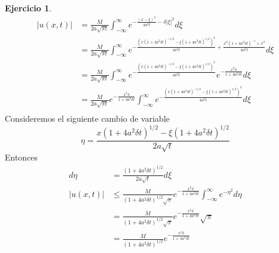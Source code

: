 \documentclass{article}
\theoremstyle{plain}
\theoremstyle{definition}
\newtheorem{ex}[proposición]{Ejercicio}
\begin{document}
\begin{ex}
\begin{align*}
    |u(x,t)| &= \frac{M}{2a\sqrt{\pi t}} \int_{-\infty}^{\infty} e^{-\frac{(x - \xi)^2}{4a^2 t} -\delta|\xi|^{2}} d\xi\\
    &= \frac{M}{2a\sqrt{\pi t}} \int_{-\infty}^{\infty} e^{-\frac{(x(1 + 4a^2 \delta  t)^{-1/2} - \xi(1+4a^2\delta  t)^{1/2})^{2}}{4a^2t} + \frac{x^2(1+4a^2\delta  t)^{-1} + x^{2}}{4a^{2}t}} d\xi \\
    &= \frac{M}{2a\sqrt{\pi t}} \int_{-\infty}^{\infty} e^{-\frac{(x(1 + 4a^2 \delta  t)^{-1/2} - \xi(1+4a^2\delta  t)^{1/2})^{2}}{4a^2t}} e^{-\frac{x^2\delta}{1+4a^2\delta  t}} d\xi \\
    &= \frac{M}{2a\sqrt{\pi t}} e^{-\frac{x^2\delta}{1+4a^2\delta  t}} \int_{-\infty}^{\infty} e^{-\frac{(x(1 + 4a^2 \delta  t)^{-1/2} - \xi(1+4a^2\delta  t)^{1/2})^{2}}{4a^2t}} d\xi \\
\end{align*}
Consideremos el siguiente cambio de variable
\[
    \eta = \frac{x(1 + 4a^2 \delta  t)^{1/2} - \xi(1+4a^2\delta  t)^{1/2}}{2a\sqrt{t}}
\]
Entonces
\begin{align*}
    d\eta &= \frac{(1 + 4a^2 \delta  t)^{1/2}}{2a\sqrt{t}} d\xi \\
    |u(x,t)| &\leq \frac{M}{(1 + 4a^2 \delta  t)^{1/2}\sqrt{\pi}} e^{-\frac{x^2\delta}{1+4a^2\delta  t}} \int_{-\infty}^{\infty} e^{-\eta^{2}} d\eta \\
    &= \frac{M}{(1 + 4a^2 \delta  t)^{1/2}\sqrt{\pi}} e^{-\frac{x^2\delta}{1+4a^2\delta  t}} \sqrt{\pi} \\
    &= \frac{M}{(1 + 4a^2 \delta  t)^{1/2}}e^{-\frac{x^2\delta}{1+4a^2\delta  t}}
\end{align*}
\end{ex}
\end{document}
